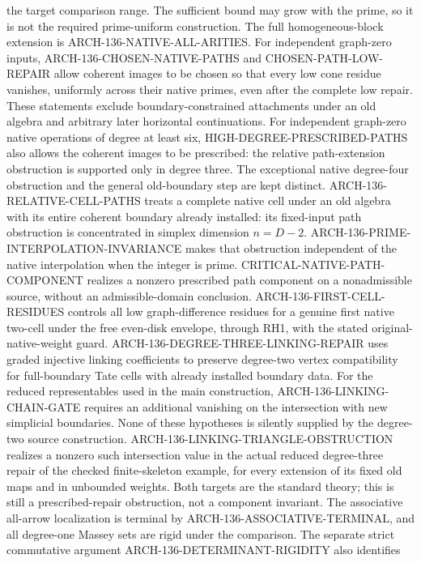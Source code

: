 \documentclass[11pt,a4paper]{article}
\begin{document}
the target comparison range. The sufficient bound may grow with
the prime, so it is not the required prime-uniform construction.
The full homogeneous-block extension is
ARCH-136-NATIVE-ALL-ARITIES. For independent graph-zero inputs,
ARCH-136-CHOSEN-NATIVE-PATHS and CHOSEN-PATH-LOW-REPAIR allow
coherent images to be chosen so that every low cone residue vanishes,
uniformly across their native primes, even after the complete low
repair. These statements exclude boundary-constrained attachments
under an old algebra and arbitrary later horizontal continuations.
For independent graph-zero native operations of degree at least six,
HIGH-DEGREE-PRESCRIBED-PATHS also allows the coherent images to be
prescribed: the relative path-extension obstruction is supported
only in degree three. The exceptional native degree-four obstruction
and the general old-boundary step are kept distinct.
ARCH-136-RELATIVE-CELL-PATHS treats a complete native cell under an old
algebra with its entire coherent boundary already installed: its
fixed-input path obstruction is concentrated in simplex dimension
$n=D-2$. ARCH-136-PRIME-INTERPOLATION-INVARIANCE makes that
obstruction independent of the native interpolation when the integer
is prime. CRITICAL-NATIVE-PATH-COMPONENT realizes a nonzero prescribed
path component on a nonadmissible source, without an admissible-domain
conclusion. ARCH-136-FIRST-CELL-RESIDUES controls all low graph-difference
residues for a genuine first native two-cell under the free even-disk
envelope, through RH1, with the stated original-native-weight guard.
ARCH-136-DEGREE-THREE-LINKING-REPAIR uses graded injective linking
coefficients to preserve degree-two vertex compatibility for full-boundary
Tate cells with already installed boundary data. For the reduced
representables used in the main construction, ARCH-136-LINKING-CHAIN-GATE
requires an additional vanishing on the intersection with new simplicial
boundaries. None of these hypotheses is silently supplied by the
degree-two source construction.
ARCH-136-LINKING-TRIANGLE-OBSTRUCTION realizes a nonzero such
intersection value in the actual reduced degree-three repair of the
checked finite-skeleton example, for every extension of its fixed old
maps and in unbounded weights. Both targets are the standard theory;
this is still a prescribed-repair obstruction, not a component invariant.
The associative all-arrow localization is
terminal by ARCH-136-ASSOCIATIVE-TERMINAL, and all degree-one
Massey sets are rigid under the comparison. The separate strict
commutative argument ARCH-136-DETERMINANT-RIGIDITY also identifies
\end{document}
